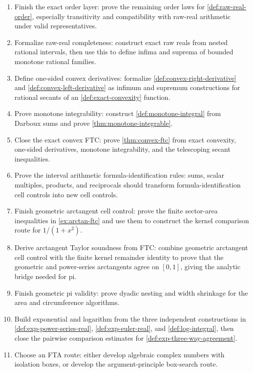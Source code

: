 \begin{enumerate}
  \item Finish the exact order layer:
  prove the remaining order laws for \cref{def:raw-real-order}, especially
  transitivity and compatibility with raw-real arithmetic under valid
  representatives.

  \item Formalize raw-real completeness:
  construct exact raw reals from nested rational intervals, then use this to
  define infima and suprema of bounded monotone rational families.

  \item Define one-sided convex derivatives:
  formalize \cref{def:convex-right-derivative} and
  \cref{def:convex-left-derivative} as infimum and supremum constructions for
  rational secants of an \cref{def:exact-convexity} function.

  \item Prove monotone integrability:
  construct \cref{def:monotone-integral} from Darboux sums and prove
  \cref{thm:monotone-integrable}.

  \item Close the exact convex FTC:
  prove \cref{thm:convex-ftc} from exact convexity, one-sided derivatives,
  monotone integrability, and the telescoping secant inequalities.

  \item Prove the interval arithmetic formula-identification rules:
  sums, scalar multiples, products, and reciprocals should transform
  formula-identification cell controls into new cell controls.

  \item Finish geometric arctangent cell control:
  prove the finite sector-area inequalities in \cref{ex:arctan-ftc} and use
  them to construct the kernel comparison route for \(1/(1+x^2)\).

  \item Derive arctangent Taylor soundness from FTC:
  combine geometric arctangent cell control with the finite kernel remainder
  identity to prove that the geometric and power-series arctangents agree on
  \([0,1]\), giving the analytic bridge needed for pi.

  \item Finish geometric pi validity:
  prove dyadic nesting and width shrinkage for the area and circumference
  algorithms.

  \item Build exponential and logarithm from the three independent
  constructions in \cref{def:exp-power-series-real},
  \cref{def:exp-euler-real}, and \cref{def:log-integral}, then close the
  pairwise comparison estimates for \cref{def:exp-three-way-agreement}.

  \item Choose an FTA route:
  either develop algebraic complex numbers with isolation boxes, or develop
  the argument-principle box-search route.
\end{enumerate}

